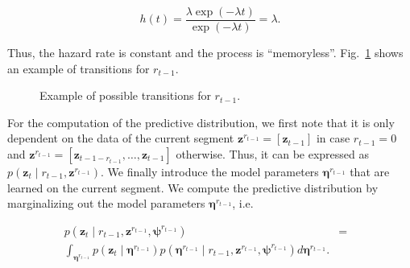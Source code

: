 \begin{equation}
\label{eqn:hazardexp}
h(t) = \frac{\lambda\exp(-\lambda t)}{\exp(-\lambda t)} = \lambda.
\end{equation}

Thus, the hazard rate is constant and the process is ``memoryless''.
Fig.~\ref{fig:transition} shows an example of transitions for $r_{t-1}$.


\begin{figure}[t]
\centering
{}
\caption{Example of possible transitions for $r_{t-1}$.}
\label{fig:transition}
\end{figure}

For the computation of the predictive distribution, we first note that it is
only dependent on the data of the current segment $\mathbf{z}^{r_{t-1}}=
[\mathbf{z}_{t-1}]$ in case $r_{t-1}=0$ and $\mathbf{z}^{r_{t-1}}=
[\mathbf{z}_{t-1-r_{t-1}},\dots,\mathbf{z}_{t-1}]$ otherwise. Thus, it can
be expressed as $p(\mathbf{z}_t\mid r_{t-1}, \mathbf{z}^{r_{t-1}})$. We finally
introduce the model parameters $\boldsymbol{\eta}^{r_{t-1}}$ that are learned
on the current segment. We compute the predictive distribution by marginalizing
out the model parameters $\boldsymbol{\eta}^{r_{t-1}}$, i.e.

\begin{eqnarray}
\label{eqn:preddistr}
p(\mathbf{z}_t\mid r_{t-1},\mathbf{z}^{r_{t-1}},\boldsymbol{\psi}^{r_{t-1}})
&=&\nonumber\\\int_{\boldsymbol{\eta}^{r_{t-1}}}
p(\mathbf{z}_t\mid\boldsymbol{\eta}^{r_{t-1}})p(\boldsymbol{\eta}^{r_{t-1}}\mid
r_{t-1},\mathbf{z}^{r_{t-1}},\boldsymbol{\psi}^{r_{t-1}})
d\boldsymbol{\eta}^{r_{t-1}}.
\end{eqnarray}

